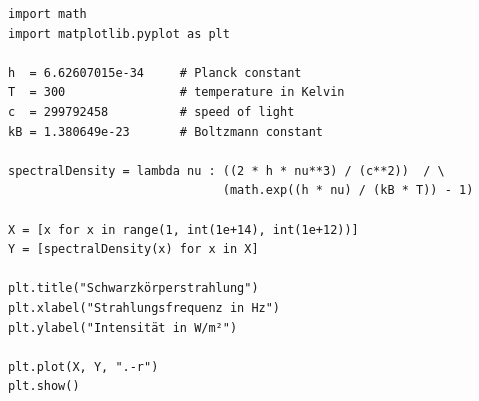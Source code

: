 
\begin{frame}[fragile]
%
\begin{codebox}
\begin{verbatim}
import math
import matplotlib.pyplot as plt

h  = 6.62607015e-34     # Planck constant
T  = 300                # temperature in Kelvin
c  = 299792458          # speed of light
kB = 1.380649e-23       # Boltzmann constant

spectralDensity = lambda nu : ((2 * h * nu**3) / (c**2))  / \
                              (math.exp((h * nu) / (kB * T)) - 1)

X = [x for x in range(1, int(1e+14), int(1e+12))]
Y = [spectralDensity(x) for x in X]

plt.title("Schwarzkörperstrahlung")
plt.xlabel("Strahlungsfrequenz in Hz")
plt.ylabel("Intensität in W/m²")

plt.plot(X, Y, ".-r")
plt.show()
\end{verbatim}
\end{codebox}
%
%
\end{frame}


